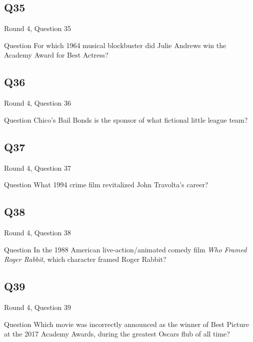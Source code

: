 \documentclass[11pt]{beamer}
\begin{document}
\subsection*{Q35}
\begin{frame}[t]{Round 4, Question 35}
\vspace{2em}
\begin{block}{Question}
For which 1964 musical blockbuster did Julie Andrews win the Academy Award for Best Actress?
\end{block}
\end{frame}
    

\subsection*{Q36}
\begin{frame}[t]{Round 4, Question 36}
\vspace{2em}
\begin{block}{Question}
Chico's Bail Bonds is the sponsor of what fictional little league team?
\end{block}
\end{frame}
    

\subsection*{Q37}
\begin{frame}[t]{Round 4, Question 37}
\vspace{2em}
\begin{block}{Question}
What 1994 crime film revitalized John Travolta's career?
\end{block}
\end{frame}
    

\subsection*{Q38}
\begin{frame}[t]{Round 4, Question 38}
\vspace{2em}
\begin{block}{Question}
In the 1988 American live-action/animated comedy film \emph{Who Framed Roger Rabbit}, which character framed Roger Rabbit?
\end{block}
\end{frame}
    

\subsection*{Q39}
\begin{frame}[t]{Round 4, Question 39}
\vspace{2em}
\begin{block}{Question}
Which movie was incorrectly announced as the winner of Best Picture at the 2017 Academy Awards, during the greatest Oscars flub of all time?
\end{block}
\end{frame}
    
\end{document}
